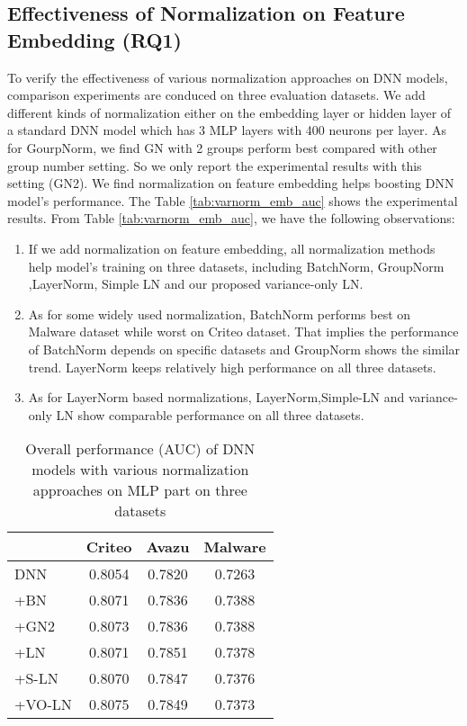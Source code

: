 \documentclass[sigconf]{acmart}
\begin{document}
\subsection{Effectiveness of Normalization on Feature Embedding (RQ1)}
To verify the effectiveness of various normalization approaches on DNN models, comparison experiments are conduced on three evaluation datasets. We add different kinds of normalization either on the embedding layer or hidden layer of a standard DNN model which has 3 MLP layers with 400 neurons per layer. As for GourpNorm, we find GN with 2 groups perform best compared with other group number setting. So we only report the experimental results with this setting (GN2).
We find normalization on feature embedding helps boosting DNN model's performance. The Table \ref{tab:varnorm_emb_auc} shows the experimental results. From Table \ref{tab:varnorm_emb_auc}, we have the following observations:
\begin{enumerate}
  \item If we add normalization on feature embedding, all normalization methods help model's training on three datasets, including BatchNorm, GroupNorm ,LayerNorm, Simple LN and our proposed variance-only LN.
  \item As for some widely used normalization, BatchNorm performs best on Malware dataset while worst on Criteo dataset. That implies the performance of BatchNorm depends on specific datasets and GroupNorm shows the similar trend.  LayerNorm keeps relatively high performance on all three datasets.
  \item As for LayerNorm based normalizations,  LayerNorm,Simple-LN and variance-only LN show comparable performance on all three datasets.
\end{enumerate}


\begin{table}
  \caption{Overall performance (AUC) of DNN models with various normalization approaches on MLP part on three datasets}
  \begin{tabular}{l|ccc}
    \toprule
    &
    Criteo &
    Avazu &
     Malware \\
     \midrule
       DNN &
    0.8054 &
    0.7820 &
    0.7263 \\
    \midrule
       +BN &
    0.8071 &
    0.7836 &
    0.7388 \\
       +GN2 &
    0.8073 &
    0.7836 &
    0.7388 \\
       +LN &
    0.8071 &
    0.7851 &
    0.7378 \\
       +S-LN &
    0.8070 &
    0.7847 &
    0.7376 \\
       +VO-LN &
    0.8075 &
    0.7849 &
    0.7373 \\
\bottomrule
  \end{tabular}
  \label{tab:varnorm_mlp_auc}

\end{table}
\end{document}
